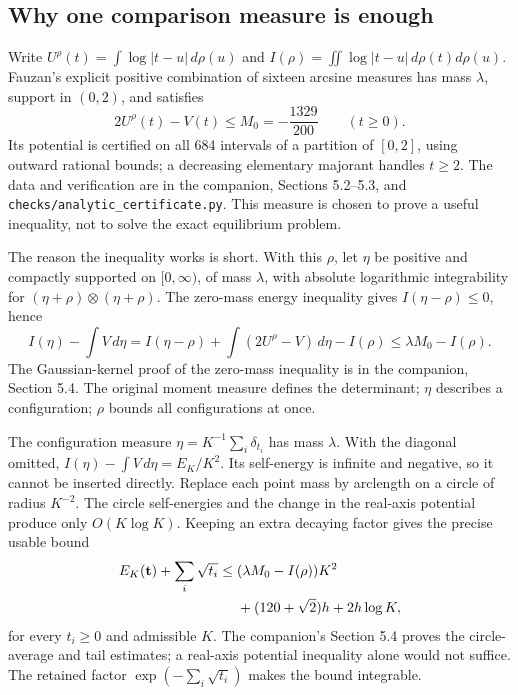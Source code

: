 \subsection{Why one comparison measure is enough}

Write \(U^\rho(t)=\int\log|t-u|\,d\rho(u)\) and
\(I(\rho)=\iint\log|t-u|\,d\rho(t)d\rho(u)\).
Fauzan's explicit positive combination of sixteen arcsine measures
has mass \(\lambda\), support in \((0,2)\), and satisfies
\begin{equation}\label{analytic:potential-target}
 2U^\rho(t)-V(t)\le M_0=-\frac{1329}{200}
 \qquad(t\ge0).
\end{equation}
Its potential is certified on all 684 intervals of a partition of
\([0,2]\), using outward rational bounds; a decreasing elementary
majorant handles \(t\ge2\). The data and verification are in the
companion, Sections 5.2--5.3, and \texttt{checks/analytic\_certificate.py}.
This measure is chosen to prove a useful inequality, not to solve
the exact equilibrium problem.

The reason the inequality works is short. With this \(\rho\), let
\(\eta\) be positive and compactly supported on \([0,\infty)\), of
mass \(\lambda\), with absolute logarithmic integrability for
\((\eta+\rho)\otimes(\eta+\rho)\).
The zero-mass energy inequality gives \(I(\eta-\rho)\le0\), hence
\[
 I(\eta)-\int V\,d\eta
 =I(\eta-\rho)+\int(2U^\rho-V)\,d\eta-I(\rho)
 \le\lambda M_0-I(\rho).
\]
The Gaussian-kernel proof of the zero-mass inequality is in the
companion, Section 5.4. The original moment measure defines the
determinant; \(\eta\) describes a configuration; \(\rho\) bounds all
configurations at once.

The configuration measure \(\eta=K^{-1}\sum_i\delta_{t_i}\) has mass
\(\lambda\). With the diagonal omitted,
\(I(\eta)-\int V\,d\eta=E_K/K^2\).
Its self-energy is infinite and negative, so it cannot be inserted
directly. Replace each point mass by arclength
on a circle of radius \(K^{-2}\). The circle self-energies and the
change in the real-axis potential produce only \(O(K\log K)\).
Keeping an extra decaying factor gives the precise usable bound
\begin{align}\label{analytic:configuration}
 E_K(\mathbf t)+\sum_i\sqrt{t_i}
 \le{}&(\lambda M_0-I(\rho))K^2\\
      &+(120+\sqrt2)h+2h\log K,\notag
\end{align}
for every \(t_i\ge0\) and admissible \(K\).
The companion's Section 5.4 proves the circle-average and tail
estimates; a real-axis potential inequality alone would not suffice.
The retained factor \(\exp(-\sum_i\sqrt{t_i})\) makes the bound integrable.


